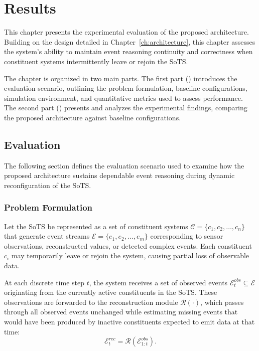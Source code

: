 \chapter{Results}\label{ch:results}
This chapter presents the experimental evaluation of the proposed architecture. Building on the design detailed in Chapter~\ref{ch:architecture}, this chapter assesses the system’s ability to maintain event reasoning continuity and correctness when constituent systems intermittently leave or rejoin the SoTS.  

The chapter is organized in two main parts. The first part () introduces the evaluation scenario, outlining the problem formulation, baseline configurations, simulation environment, and quantitative metrics used to assess performance. The second part () presents and analyzes the experimental findings, comparing the proposed architecture against baseline configurations.


\section{Evaluation}\label{sec:results-eval}
The following section defines the evaluation scenario used to examine how the proposed architecture sustains dependable event reasoning during dynamic reconfiguration of the SoTS.

\subsection{Problem Formulation}
\label{subsec:results-eval-problem-formulation}

Let the SoTS be represented as a set of constituent systems 
$\mathcal{C} = \{ c_1, c_2, \dots, c_n \}$ 
that generate event streams 
$\mathcal{E} = \{ e_1, e_2, \dots, e_m \}$ 
corresponding to sensor observations, reconstructed values, or detected complex events.
Each constituent $c_i$ may temporarily leave or rejoin the system, causing partial loss of observable data.

\smallskip
At each discrete time step $t$, the system receives a set of observed events 
$\mathcal{E}_t^{obs} \subseteq \mathcal{E}$ 
originating from the currently active constituents in the SoTS.  
These observations are forwarded to the reconstruction module $\mathcal{R}(\cdot)$, which passes through all observed events unchanged while estimating missing events that would have been produced by inactive constituents expected to emit data at that time:
\begin{equation}
    \mathcal{E}_t^{rec} = \mathcal{R}(\mathcal{E}_{1:t}^{obs}).
\end{equation}

